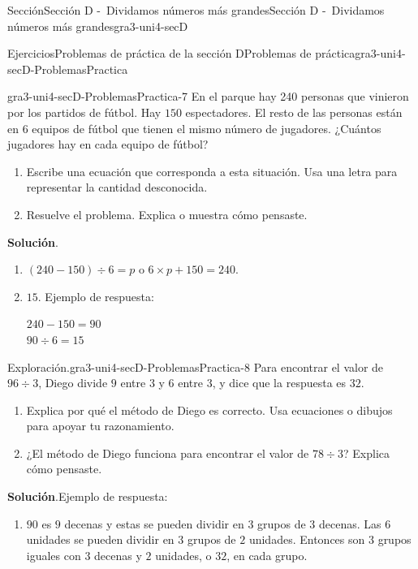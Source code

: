 \documentclass[oneside,10pt,]{article}
\newcommand{\blocktitlefont}{\relax}
\begin{document}
\begin{sectionptx}{Sección}{Sección D -~Dividamos números más grandes}{}{Sección D -~Dividamos números más grandes}{}{}{gra3-uni4-secD}
\begin{exercises-subsection}{Ejercicios}{Problemas de práctica de la sección D}{}{Problemas de práctica}{}{}{gra3-uni4-secD-ProblemasPractica}
\begin{divisionexercise}{5}{}{}{gra3-uni4-secD-ProblemasPractica-7}%
En el parque hay 240 personas que vinieron por los partidos de fútbol. Hay \(150\) espectadores. El resto de las personas están en \(6\) equipos de fútbol que tienen el mismo número de jugadores. ¿Cuántos jugadores hay en cada equipo de fútbol?%
%
\begin{enumerate}[label={(\alph*)}]
\item{}Escribe una ecuación que corresponda a esta situación. Usa una letra para representar la cantidad desconocida.%
\item{}Resuelve el problema. Explica o muestra cómo pensaste.%
\end{enumerate}
\par\smallskip%
\noindent\textbf{\blocktitlefont Solución}.\hypertarget{gra3-uni4-secD-ProblemasPractica-7-2}{}\quad{}%
\begin{enumerate}[label={(\alph*)}]
\item{}\((240 - 150) \div 6 = p\) o \(6 \times p + 150 = 240\).%
\item{}\(15\). Ejemplo de respuesta:%
\par
\(240 - 150 = 90\)\\
 \(90 \div 6 = 15\)%
\end{enumerate}
\end{divisionexercise}%
\begin{divisionexercise}{6}{Exploración.}{}{gra3-uni4-secD-ProblemasPractica-8}%
Para encontrar el valor de \(96 \div 3\), Diego divide \(9\) entre \(3\) y \(6\) entre \(3\), y dice que la respuesta es \(32\).%
%
\begin{enumerate}[label={(\alph*)}]
\item{}Explica por qué el método de Diego es correcto. Usa ecuaciones o dibujos para apoyar tu razonamiento.%
\item{}¿El método de Diego funciona para encontrar el valor de \(78 \div 3\)? Explica cómo pensaste.%
\end{enumerate}
\par\smallskip%
\noindent\textbf{\blocktitlefont Solución}.\hypertarget{gra3-uni4-secD-ProblemasPractica-8-3}{}\quad{}Ejemplo de respuesta:%
%
\begin{enumerate}[label={(\alph*)}]
\item{}\(90\) es \(9\) decenas y estas se pueden dividir en \(3\) grupos de \(3\) decenas. Las \(6\) unidades se pueden dividir en \(3\) grupos de \(2\) unidades. Entonces son \(3\) grupos iguales con \(3\) decenas y \(2\) unidades, o \(32\), en cada grupo.%

\end{enumerate}
\end{divisionexercise}
\end{exercises-subsection}
\end{sectionptx}
\end{document}
